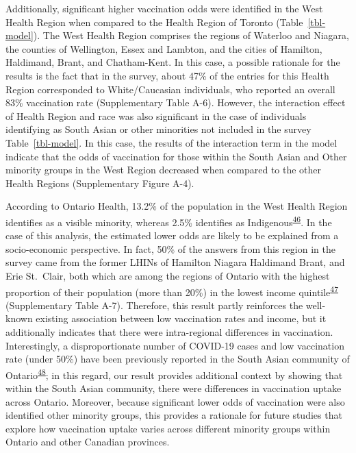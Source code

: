 \documentclass[
  letterpaper,
  DIV=11,
  numbers=noendperiod]{scrartcl}
\begin{document}
Additionally, significant higher vaccination odds were identified in the
West Health Region when compared to the Health Region of Toronto
(Table~\ref{tbl-model}). The West Health Region comprises the regions of
Waterloo and Niagara, the counties of Wellington, Essex and Lambton, and
the cities of Hamilton, Haldimand, Brant, and Chatham-Kent. In this
case, a possible rationale for the results is the fact that in the
survey, about 47\% of the entries for this Health Region corresponded to
White/Caucasian individuals, who reported an overall 83\% vaccination
rate (Supplementary Table A-6). However, the interaction effect of
Health Region and race was also significant in the case of individuals
identifying as South Asian or other minorities not included in the
survey Table~\ref{tbl-model}. In this case, the results of the
interaction term in the model indicate that the odds of vaccination for
those within the South Asian and Other minority groups in the West
Region decreased when compared to the other Health Regions
(Supplementary Figure A-4).

According to Ontario Health, 13.2\% of the population in the West Health
Region identifies as a visible minority, whereas 2.5\% identifies as
Indigenous\textsuperscript{\protect\hyperlink{ref-ontariohealth}{46}}.
In the case of this analysis, the estimated lower odds are likely to be
explained from a socio-economic perspective. In fact, 50\% of the
answers from this region in the survey came from the former LHINs of
Hamilton Niagara Haldimand Brant, and Erie St.~Clair, both which are
among the regions of Ontario with the highest proportion of their
population (more than 20\%) in the lowest income
quintile\textsuperscript{\protect\hyperlink{ref-buajitti2018}{47}}
(Supplementary Table A-7). Therefore, this result partly reinforces the
well-known existing association between low vaccination rates and
income, but it additionally indicates that there were intra-regional
differences in vaccination. Interestingly, a disproportionate number of
COVID-19 cases and low vaccination rate (under 50\%) have been
previously reported in the South Asian community of
Ontario\textsuperscript{\protect\hyperlink{ref-anand2022}{48}}; in this
regard, our result provides additional context by showing that within
the South Asian community, there were differences in vaccination uptake
across Ontario. Moreover, because significant lower odds of vaccination
were also identified other minority groups, this provides a rationale
for future studies that explore how vaccination uptake varies across
different minority groups within Ontario and other Canadian provinces.
\end{document}
